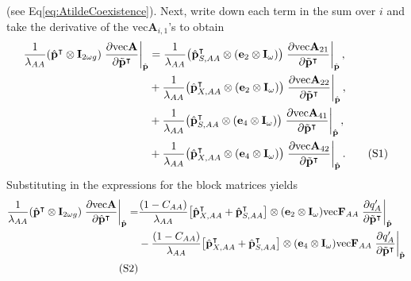 \documentclass[11pt]{article}
\newcommand\numberthis{\addtocounter{equation}{1}\tag{\theequation}}
\def\mbf#1{\mathbf{#1}}
\begin{document}
\noindent (see Eq{\ref{eq:AtildeCoexistence}}). Next, write down each term in the sum over $i$ and take the derivative  of the $\text{vec}\mbf{A}_{i,1}$'s to obtain
\begin{align*}
	\frac{1}{\lambda_{AA}}(\hat{\mbf{p}}^{\intercal} \otimes \mbf{I}_{2 \omega g}) \left. \frac{ \partial \text{vec}\mbf{A}}{\partial \tilde{\mbf{p}}^{\intercal}} \right|_{\hat{\mbf{p}}} &= \frac{1}{\lambda_{AA}} \big( \hat{\mbf{p}}^{\intercal}_{S,AA} \otimes (\mbf{e}_{2} \otimes \mbf{I}_{\omega}) \big) \left. \frac{ \partial \text{vec}\mbf{A}_{21}}{\partial \tilde{\mbf{p}}^{\intercal}} \right|_{\hat{\mbf{p}}}, \\
		&+ \frac{1}{\lambda_{AA}} \big( \hat{\mbf{p}}^{\intercal}_{X,AA} \otimes (\mbf{e}_{2} \otimes \mbf{I}_{\omega}) \big) \left. \frac{ \partial \text{vec}\mbf{A}_{22}}{\partial \tilde{\mbf{p}}^{\intercal}} \right|_{\hat{\mbf{p}}}, \\
		&+\frac{1}{\lambda_{AA}} \big( \hat{\mbf{p}}^{\intercal}_{S,AA} \otimes (\mbf{e}_{4} \otimes \mbf{I}_{\omega}) \big) \left. \frac{ \partial \text{vec}\mbf{A}_{41}}{\partial \tilde{\mbf{p}}^{\intercal}} \right|_{\hat{\mbf{p}}}, \\
		&+ \frac{1}{\lambda_{AA}} \big( \hat{\mbf{p}}^{\intercal}_{X,AA} \otimes (\mbf{e}_{4} \otimes \mbf{I}_{\omega}) \big) \left. \frac{ \partial \text{vec}\mbf{A}_{42}}{\partial \tilde{\mbf{p}}^{\intercal}} \right|_{\hat{\mbf{p}}}. \numberthis
\end{align*}
Substituting in the expressions for the block matrices yields
\begin{align*}
	\frac{1}{\lambda_{AA}}(\hat{\mbf{p}}^{\intercal} \otimes \mbf{I}_{2 \omega g}) \left. \frac{ \partial \text{vec}\mbf{A}}{\partial \hat{\mbf{p}}^{\intercal}} \right|_{\hat{\mbf{p}}} = 
		&\frac{(1 - C_{AA})}{\lambda_{AA}} \big[ \hat{\mbf{p}}^{\intercal}_{X,AA}+ \hat{\mbf{p}}^{\intercal}_{S,AA} \big]\otimes (\mbf{e}_{2} \otimes \mbf{I}_{\omega}) \text{vec}\mbf{F}_{AA} \left.\frac{\partial q^{\prime}_{A}}{\partial \tilde{\mbf{p}}^{\intercal}} \right|_{\hat{\mbf{p}}} \\
		&-\frac{(1 - C_{AA})}{\lambda_{AA}} \big[ \hat{\mbf{p}}^{\intercal}_{X,AA}+ \hat{\mbf{p}}^{\intercal}_{S,AA} \big]\otimes (\mbf{e}_{4} \otimes \mbf{I}_{\omega}) \text{vec}\mbf{F}_{AA} \left.\frac{\partial q^{\prime}_{A}}{\partial \tilde{\mbf{p}}^{\intercal}} \right|_{\hat{\mbf{p}}} \\
	   \numberthis
\end{align*}
\end{document}

